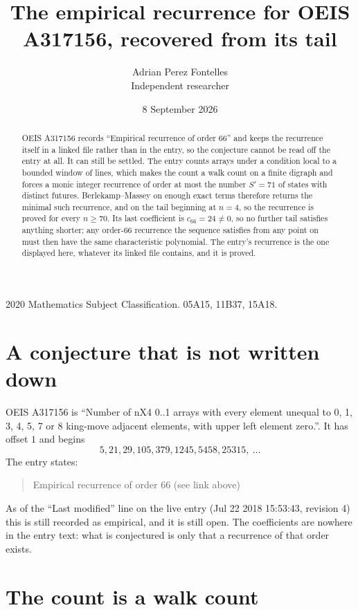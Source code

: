 \documentclass[11pt,a4paper]{article}
\title{The empirical recurrence for OEIS A317156, recovered from its tail}
\author{Adrian Perez Fontelles\\ \small Independent researcher}
\date{8 September 2026}
\theoremstyle{plain}
\theoremstyle{definition}
\begin{document}
\maketitle

\begin{abstract}
OEIS A317156 records ``Empirical recurrence of order $66$'' and keeps the recurrence itself in
a linked file rather than in the entry, so the conjecture cannot be read off the entry at all.
It can still be settled. The entry counts arrays under a condition local to a bounded window of
lines, which makes the count a walk count on a finite digraph and forces a monic integer
recurrence of order at most the number $S'=71$ of states with distinct futures. Berlekamp--Massey on
enough exact terms therefore returns the minimal such recurrence, and on the tail beginning at $n=4$, so the recurrence is proved for every $n\ge70$.
Its last coefficient is $c_{66}=24\neq0$, so no further tail satisfies anything
shorter; any order-$66$ recurrence the sequence satisfies from any point on must then have
the same characteristic polynomial. The entry's recurrence is the one displayed here, whatever
its linked file contains, and it is proved.
\end{abstract}

\noindent\small 2020 Mathematics Subject Classification. 05A15, 11B37, 15A18.\normalsize

\section{A conjecture that is not written down}

OEIS A317156 is ``Number of nX4 0..1 arrays with every element unequal to 0, 1, 3, 4, 5, 7 or 8 king-move adjacent elements, with upper left element zero.''. It has offset $1$ and begins
\[
5, 21, 29, 105, 379, 1245, 5458, 25315,\ \dots
\]
The entry states:
\begin{quote}
Empirical recurrence of order 66 (see link above)
\end{quote}
As of the ``Last modified'' line on the live entry (Jul 22 2018 15:53:43, revision 4)
this is still recorded as empirical, and it is still open. The coefficients are nowhere in the
entry text: what is conjectured is only that a recurrence of that order exists.

\section{The count is a walk count}
\end{document}
